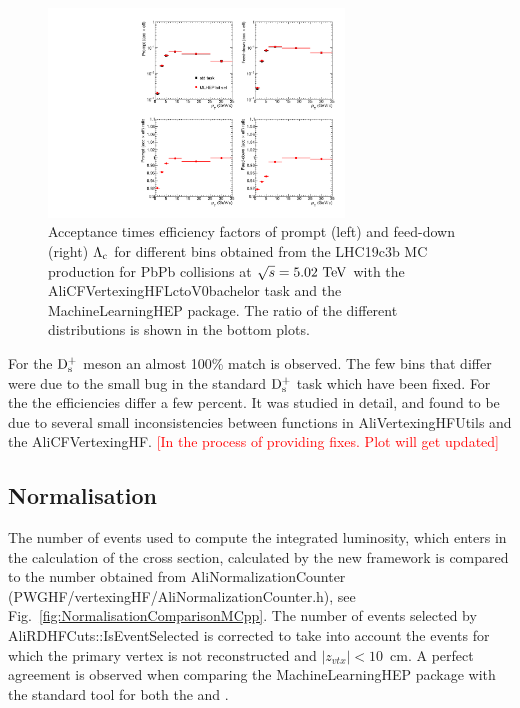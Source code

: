 \begin{figure}[tb]
\begin{center}
\includegraphics[width=0.7\textwidth]{figures/LcEfficiencyComparison.pdf}
\caption{Acceptance times efficiency factors of prompt (left) and feed-down (right) $\mbox{$\mathrm {\Lambda_{c}}$}$ for different \pt bins obtained from the LHC19c3b MC production for PbPb collisions at $\sqrt{s}=5.02~\mathrm{TeV}$ with the AliCFVertexingHFLctoV0bachelor task and the MachineLearningHEP package. The ratio of the different distributions is shown in the bottom plots. }
\label{fig:EffLcComparisonMCPbPb}
\end{center}
\end{figure}

For the $\rm D_s^+$ meson an almost 100\% match is observed. The few bins that differ were due to the small bug in the standard $\rm D_s^+$ task which  have been fixed. For the \Lc the efficiencies differ a few percent. It was studied in detail, and found to be due to several small inconsistencies between functions in AliVertexingHFUtils and the AliCFVertexingHF. \textcolor{red}{[In the process of providing fixes. Plot will get updated]}

\subsection{Normalisation}
\label{subsec:normValidation}

The number of events used to compute the integrated luminosity, which enters in the calculation of the cross section, calculated by the new framework is compared to the number obtained from AliNormalizationCounter (PWGHF/vertexingHF/AliNormalizationCounter.h), see Fig.~\ref{fig:NormalisationComparisonMCpp}. The number of events selected by AliRDHFCuts::IsEventSelected is corrected to take into account the events for which the primary vertex is not reconstructed and $|z_{vtx}|<10$~cm. A perfect agreement is observed when comparing the MachineLearningHEP package with the standard tool for both the \Ds and \Lc.
 
